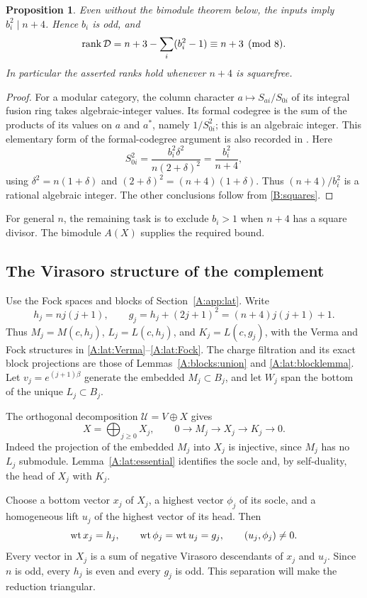 \documentclass[11pt]{article}
\newtheorem{proposition}[theorem]{Proposition}
\newcommand{\rank}{\operatorname{rank}}\newcommand{\End}{\operatorname{End}}
\numberwithin{equation}{section}
\begin{document}
\begin{proposition}\label{B:squarefree}
Even without the bimodule theorem below, the inputs imply $b_i^2\mid n+4$. Hence $b_i$ is odd, and
\[
 \rank\D=n+3-\sum_i(b_i^2-1)\equiv n+3\pmod8.
\]
In particular the asserted ranks hold whenever $n+4$ is squarefree.
\end{proposition}
\begin{proof}
For a modular category, the column character $a\mapsto S_{ai}/S_{0i}$ of its integral fusion ring takes algebraic-integer values. Its formal codegree is the sum of the products of its values on $a$ and $a^*$, namely $1/S_{0i}^2$; this is an algebraic integer. This elementary form of the formal-codegree argument is also recorded in \cite{B:Ostrik}.
Here
\[
 S_{0i}^2=\frac{b_i^2\delta^2}{n(2+\delta)^2}
 =\frac{b_i^2}{n+4},
\]
using $\delta^2=n(1+\delta)$ and $(2+\delta)^2=(n+4)(1+\delta)$. Thus $(n+4)/b_i^2$ is a rational algebraic integer. The other conclusions follow from \eqref{B:squares}.
\end{proof}
For general $n$, the remaining task is to exclude $b_i>1$ when $n+4$ has a square divisor. The bimodule $A(X)$ supplies the required bound.

\subsection{The Virasoro structure of the complement}
Use the Fock spaces and blocks of Section~\ref{A:app:lat}. Write
\[
 h_j=nj(j+1),\qquad g_j=h_j+(2j+1)^2=(n+4)j(j+1)+1.
\]
Thus $M_j=M(c,h_j)$, $L_j=L(c,h_j)$, and $K_j=L(c,g_j)$, with the Verma and Fock structures in \eqref{A:lat:Verma}--\eqref{A:lat:Fock}. The charge filtration and its exact block projections are those of Lemmas~\ref{A:blocks:union} and \ref{A:lat:blocklemma}. Let $v_j=e^{(j+1)\beta}$ generate the embedded $M_j\subset B_j$, and let $W_j$ span the bottom of the unique $L_j\subset B_j$.

The orthogonal decomposition $\mathcal U=V\oplus X$ gives
\begin{equation}\label{B:Xblocks}
 X=\bigoplus_{j\geq0}X_j,\qquad
 0\longrightarrow M_j\longrightarrow X_j\longrightarrow K_j\longrightarrow0.
\end{equation}
Indeed the projection of the embedded $M_j$ into $X_j$ is injective, since $M_j$ has no $L_j$ submodule. Lemma~\ref{A:lat:essential} identifies the socle and, by self-duality, the head of $X_j$ with $K_j$.

Choose a bottom vector $x_j$ of $X_j$, a highest vector $\phi_j$ of its socle, and a homogeneous lift $u_j$ of the highest vector of its head. Then
\[
 \operatorname{wt} x_j=h_j,\qquad \operatorname{wt}\phi_j=\operatorname{wt} u_j=g_j,\qquad (u_j,\phi_j)\ne0.
\]
Every vector in $X_j$ is a sum of negative Virasoro descendants of $x_j$ and $u_j$. Since $n$ is odd, every $h_j$ is even and every $g_j$ is odd. This separation will make the reduction triangular.
\end{document}
